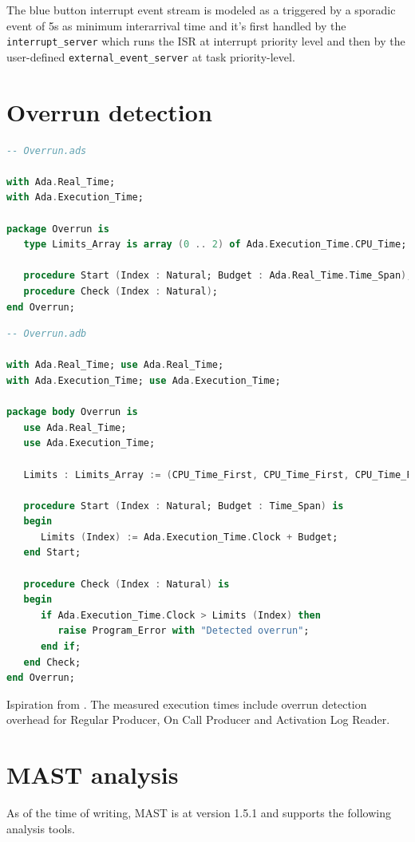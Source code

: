\documentclass{article}
\begin{document}
The blue button interrupt event stream is modeled as a triggered by a sporadic event of 5s as minimum interarrival time and it's first handled by the \texttt{interrupt\_server} which runs the ISR at interrupt priority level and then by the user-defined \texttt{external\_event\_server} at task priority-level.

\section{Overrun detection}

\begin{lstlisting}[language=Ada]
-- Overrun.ads

with Ada.Real_Time;
with Ada.Execution_Time;

package Overrun is
   type Limits_Array is array (0 .. 2) of Ada.Execution_Time.CPU_Time;

   procedure Start (Index : Natural; Budget : Ada.Real_Time.Time_Span);
   procedure Check (Index : Natural);
end Overrun;
\end{lstlisting}

\begin{lstlisting}[language=Ada]
-- Overrun.adb

with Ada.Real_Time; use Ada.Real_Time;
with Ada.Execution_Time; use Ada.Execution_Time;

package body Overrun is
   use Ada.Real_Time;
   use Ada.Execution_Time;

   Limits : Limits_Array := (CPU_Time_First, CPU_Time_First, CPU_Time_First);

   procedure Start (Index : Natural; Budget : Time_Span) is
   begin
      Limits (Index) := Ada.Execution_Time.Clock + Budget;
   end Start;

   procedure Check (Index : Natural) is
   begin
      if Ada.Execution_Time.Clock > Limits (Index) then
         raise Program_Error with "Detected overrun";
      end if;
   end Check;
end Overrun;
\end{lstlisting}

Ispiration from \cite{overrundetection}. The measured execution times include overrun detection overhead for Regular Producer, On Call Producer and Activation Log Reader.

\section{MAST analysis}

As of the time of writing, MAST is at version 1.5.1 and supports the following analysis tools.
\end{document}
